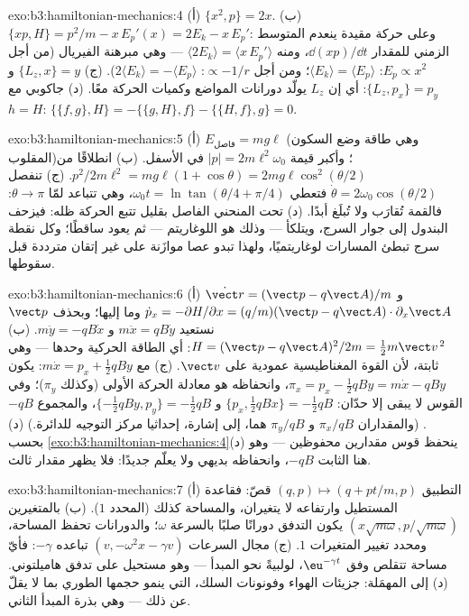\begin{solution}{exo:b3:hamiltonian-mechanics:4}
(أ) $\{x^2, p\} = 2x$. (ب) $\{xp, H\} = p^2/m - x\,E_p'(x) = 2E_k -
x\,E_p'$: وعلى حركة مقيدة ينعدم المتوسط الزمني للمقدار $\dd(xp)/\dd t$،
ومنه $\langle 2E_k\rangle = \langle x\,E_p'\rangle$ --- وهي
مبرهنة الفيريال (من أجل $E_p \propto x^2$: $\langle E_k\rangle = \langle
E_p\rangle$؛ ومن أجل $\propto -1/r$: $2\langle E_k\rangle = -\langle
E_p\rangle$). (ج) $\{L_z, x\} = y$ و $\{L_z, p_x\} = p_y$: أي إن $L_z$
يولّد دورانات المواضع وكميات الحركة معًا. (د) جاكوبي مع $h
= H$: $\{\{f, g\}, H\} = -\{\{g, H\}, f\} - \{\{H, f\}, g\} = 0$.
\end{solution}

\begin{solution}{exo:b3:hamiltonian-mechanics:5}
(أ) $E_{\text{فاصل}} = mg\ell$ (وهي طاقة وضع السكون المقلوب)؛
وأكبر قيمة $|p| = 2m\ell^2\omega_0$ في الأسفل. (ب) انطلاقًا من
$p^2/2m\ell^2 = mg\ell(1 + \cos\theta) = 2mg\ell\cos^2(\theta/2)$. (ج)
تنفصل $\dot\theta = 2\omega_0\cos(\theta/2)$ فتعطي $\omega_0t =
\ln\tan(\theta/4 + \pi/4)$، وهي تتباعد لمّا $\theta \to \pi$: فالقمة
تُقارَب ولا تُبلَغ أبدًا. (د) تحت المنحني الفاصل بقليل تتبع
الحركة ظله: فيزحف البندول إلى جوار السرج، ويتلكأ --- وذلك هو
اللوغاريتم --- ثم يعود ساقطًا؛ وكل نقطة سرج تبطئ المسارات
لوغاريتميًا، ولهذا تبدو عصا موازَنة على غير إتقان مترددة قبل
سقوطها.
\end{solution}

\begin{solution}{exo:b3:hamiltonian-mechanics:6}
(أ) $\dot{\vect r} = (\vect p - q\vect A)/m$ و $\dot p_x =
-\partial H/\partial x = (q/m)(\vect p - q\vect A)\cdot\partial_x\vect
A$ وما إليها؛ وبحذف $\vect p$ نستعيد $m\ddot x = qB\dot y$ و
$m\ddot y = -qB\dot x$. (ب) $H = (\vect p - q\vect A)^2/2m = \tfrac12
m\vect v^{\,2}$: أي الطاقة الحركية وحدها --- وهي ثابتة، لأن القوة
المغناطيسية عمودية على $\vect v$. (ج) مع $m\dot x = p_x +
\tfrac12 qBy$: يكون $\pi_x = p_x - \tfrac12 qBy = m\dot x - qBy$، وانحفاظه
هو معادلة الحركة الأولى (وكذلك $\pi_y$)؛ وفي
القوس لا يبقى إلا حدّان: $\{p_x, \tfrac12 qBx\} = -\tfrac12
qB$ و $\{-\tfrac12 qBy, p_y\} = -\tfrac12 qB$، والمجموع $-qB$. (والمقداران $\pi_x/qB$ و $\pi_y/qB$
هما، إلى إشارة، إحداثيا مركز التوجيه
للدائرة.) (د) بحسب \cref{exo:b3:hamiltonian-mechanics:4}(د) ينحفظ
قوس مقدارين محفوظين --- وهو هنا الثابت
$-qB$، وانحفاظه بديهي ولا يعلّم جديدًا: فلا يظهر مقدار ثالث.
\end{solution}

\begin{solution}{exo:b3:hamiltonian-mechanics:7}
(أ) التطبيق $(q, p) \mapsto (q + pt/m, p)$ قصّ: فقاعدة المستطيل
وارتفاعه لا يتغيران، والمساحة كذلك (المحدد $1$).
(ب) بالمتغيرين $(x\sqrt{m\omega}, p/\sqrt{m\omega})$ يكون التدفق
دورانًا صلبًا بالسرعة $\omega$؛ والدورانات تحفظ المساحة، ومحدد
تغيير المتغيرات $1$. (ج) مجال السرعات
$(v, -\omega^2x - \gamma v)$ تباعده $-\gamma$: فأيّ مساحة
تتقلص وفق $\eu^{-\gamma t}$، لولبيةً نحو المبدأ --- وهو مستحيل
على تدفق هاميلتوني. (د) إلى  المهمَلة: جزيئات
الهواء وفونونات السلك، التي ينمو حجمها الطوري بما لا يقلّ عن
ذلك --- وهي بذرة المبدأ الثاني.
\end{solution}

